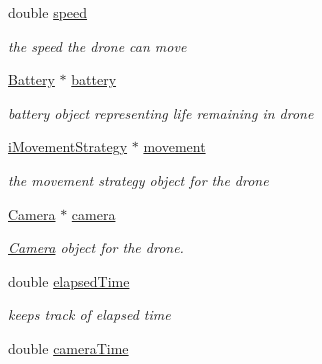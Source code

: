 \begin{DoxyCompactItemize}
\mbox{\label{classDrone_a4cbe7d72da36c27cb58fa797240c9698}} 
double \hyperlink{classDrone_a4cbe7d72da36c27cb58fa797240c9698}{speed}
\begin{DoxyCompactList}\small\item\em the speed the drone can move \end{DoxyCompactList}\item 
\mbox{\label{classDrone_aa8177686267728ddaed8c6aaff11f605}} 
\hyperlink{classBattery}{Battery} $\ast$ \hyperlink{classDrone_aa8177686267728ddaed8c6aaff11f605}{battery}
\begin{DoxyCompactList}\small\item\em battery object representing life remaining in drone \end{DoxyCompactList}\item 
\mbox{\label{classDrone_a45d19476c877bea9175e2b3d491994fb}} 
\hyperlink{classiMovementStrategy}{i\+Movement\+Strategy} $\ast$ \hyperlink{classDrone_a45d19476c877bea9175e2b3d491994fb}{movement}
\begin{DoxyCompactList}\small\item\em the movement strategy object for the drone \end{DoxyCompactList}\item 
\mbox{\label{classDrone_aab172d13642014c08807fc71d04600d3}} 
\hyperlink{classCamera}{Camera} $\ast$ \hyperlink{classDrone_aab172d13642014c08807fc71d04600d3}{camera}
\begin{DoxyCompactList}\small\item\em \hyperlink{classCamera}{Camera} object for the drone. \end{DoxyCompactList}\item 
\mbox{\label{classDrone_a67e8d4713426b85ceacd4f93e5d13445}} 
double \hyperlink{classDrone_a67e8d4713426b85ceacd4f93e5d13445}{elapsed\+Time}
\begin{DoxyCompactList}\small\item\em keeps track of elapsed time \end{DoxyCompactList}\item 
\mbox{\label{classDrone_ac02d8033dcd953191995f71656e79ab4}} 
double \hyperlink{classDrone_ac02d8033dcd953191995f71656e79ab4}{camera\+Time}

\end{DoxyCompactItemize}
